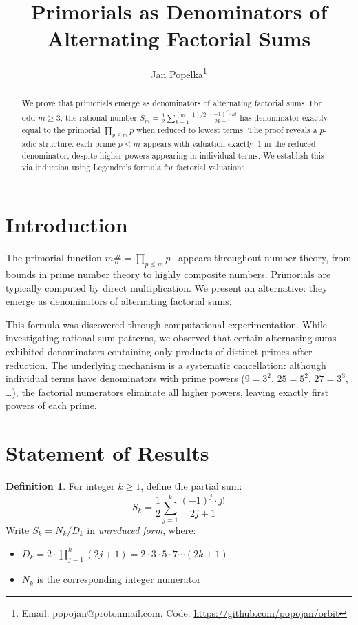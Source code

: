 \documentclass[11pt]{article}
\title{Primorials as Denominators of Alternating Factorial Sums}
\author{Jan Popelka\thanks{Email: popojan@protonmail.com. Code: \url{https://github.com/popojan/orbit}}}
\date{}
\theoremstyle{definition}
\newtheorem{definition}[theorem]{Definition}
\theoremstyle{remark}
\begin{document}
\maketitle

\begin{abstract}
We prove that primorials emerge as denominators of alternating factorial sums.
For odd $m \geq 3$, the rational number
$S_m = \frac{1}{2} \sum_{k=1}^{(m-1)/2} \frac{(-1)^k \cdot k!}{2k+1}$
has denominator exactly equal to the primorial $\prod_{p \leq m} p$ when reduced
to lowest terms. The proof reveals a $p$-adic structure: each prime $p \leq m$
appears with valuation exactly~1 in the reduced denominator, despite higher
powers appearing in individual terms. We establish this via induction using
Legendre's formula for factorial valuations.
\end{abstract}

\section{Introduction}

The primorial function $m\# = \prod_{p \leq m} p$~\cite{OEIS-A034386} appears throughout number theory,
from bounds in prime number theory to highly composite numbers. Primorials are
typically computed by direct multiplication. We present an alternative: they
emerge as denominators of alternating factorial sums.

This formula was discovered through computational experimentation. While
investigating rational sum patterns, we observed that certain alternating sums
exhibited denominators containing only products of distinct primes after
reduction. The underlying mechanism is a systematic cancellation: although
individual terms have denominators with prime powers ($9 = 3^2$, $25 = 5^2$,
$27 = 3^3$, \ldots), the factorial numerators eliminate all higher powers,
leaving exactly first powers of each prime.

\section{Statement of Results}

\begin{definition}
For integer $k \geq 1$, define the partial sum:
\[
S_k = \frac{1}{2} \sum_{j=1}^{k} \frac{(-1)^j \cdot j!}{2j+1}
\]
Write $S_k = N_k / D_k$ in \emph{unreduced form}, where:
\begin{itemize}
\item $D_k = 2 \cdot \prod_{j=1}^{k} (2j+1) = 2 \cdot 3 \cdot 5 \cdot 7 \cdots (2k+1)$
\item $N_k$ is the corresponding integer numerator
\end{itemize}
\end{definition}
\end{document}
